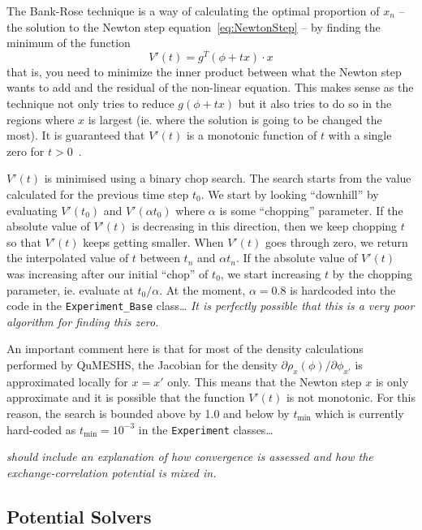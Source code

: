 \documentclass[12pt]{article}
\newcommand{\red}[1]{{\color{red} \it #1}}
\begin{document}
{The Bank-Rose technique is a way of calculating the optimal proportion of $x_n$ -- the solution
to the Newton step equation~\ref{eq:NewtonStep} -- by finding the minimum of the function
%
\begin{equation}
    V'(t) = g^T (\phi + t x) \cdot x
\end{equation}
%
that is, you need to minimize the inner product between what the Newton step wants to add and the
residual of the non-linear equation.  This makes sense as the technique not only tries to reduce
$g(\phi + tx)$ but it also tries to do so in the regions where $x$ is largest (ie. where the
solution is going to be changed the most).  It is guaranteed that $V'(t)$ is a monotonic function
of $t$ with a single zero for $t > 0$~\cite{Bank:????}.

$V'(t)$ is minimised using a binary chop search.  The search starts from the value calculated for
the previous time step $t_0$.  We start by looking ``downhill'' by evaluating $V'(t_0)$ and
$V'(\alpha t_0)$ where $\alpha$ is some ``chopping'' parameter.  If the absolute value of $V'(t)$
is decreasing in this direction, then we keep chopping $t$ so that $V'(t)$ keeps getting smaller.
When $V'(t)$ goes through zero, we return the interpolated value of $t$ between $t_n$ and
$\alpha t_n$.  If the absolute value of $V'(t)$ was increasing after our
initial ``chop'' of $t_0$, we start increasing $t$ by the chopping parameter, ie. evaluate at
$t_0 / \alpha$.  At the moment, $\alpha = 0.8$ is hardcoded into the code in the
\texttt{Experiment\_Base} class\ldots \red{It is perfectly possible that this is a very poor
algorithm for finding this zero.}

An important comment here is that for most of the density calculations performed by QuMESHS,
the Jacobian for the density $\partial \rho_x (\phi) / \partial \phi_{x'}$ is approximated
locally for $x = x'$ only.  This means that the Newton step $x$ is only approximate and it is
possible that the function $V'(t)$ is not monotonic.  For this reason, the search is bounded
above by 1.0 and below by $t_{\mathrm{min}}$ which is currently hard-coded as $t_{\mathrm{min}}
= 10^{-3}$ in the \texttt{Experiment} classes\ldots

\red{should include an explanation of how convergence is assessed and how the exchange-correlation
potential is mixed in.}


\subsection{Potential Solvers}
\label{subsec:PotentialSolvers}

}
\end{document}
